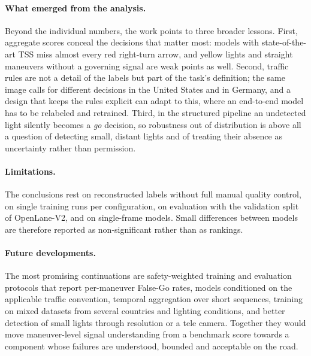 \paragraph{What emerged from the analysis.} Beyond the individual numbers, the work points to three
broader lessons. First, aggregate scores conceal the decisions that matter most: models with
state-of-the-art TSS miss almost every red right-turn arrow, and yellow lights and straight maneuvers
without a governing signal are weak points as well. Second, traffic rules are not a detail of the
labels but part of the task's definition; the same image calls for different decisions in the United
States and in Germany, and a design that keeps the rules explicit can adapt to this, where an end-to-end
model has to be relabeled and retrained. Third, in the structured pipeline an undetected light silently becomes a \emph{go}
decision, so robustness out of distribution is above all a question of detecting small, distant lights
and of treating their absence as uncertainty rather than permission.

\paragraph{Limitations.} The conclusions rest on reconstructed labels without full manual quality
control, on single training runs per configuration, on evaluation with the validation split of
OpenLane-V2, and on single-frame models. Small differences between models are therefore reported as
non-significant rather than as rankings.

\paragraph{Future developments.} The most promising continuations are safety-weighted training and
evaluation protocols that report per-maneuver False-Go rates, models conditioned on the applicable
traffic convention, temporal aggregation over short sequences, training on mixed datasets from several
countries and lighting conditions, and better detection of small lights through resolution or a tele
camera. Together they would move maneuver-level signal understanding from a benchmark score towards a
component whose failures are understood, bounded and acceptable on the road.
